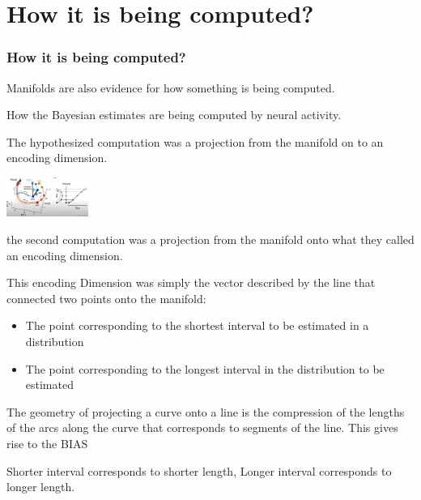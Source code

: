 \documentclass{beamer}
\begin{document}

\section{How it is being computed?}
\begin{frame}
\frametitle{\textbf{How it is being computed?} }


Manifolds are also evidence for how something is being computed.

How the Bayesian estimates are being computed by neural activity.

The hypothesized computation was a projection from the manifold on to an encoding dimension.


\centering
\begin{minipage}{1\textwidth}
    \centering
    \includegraphics[width=0.2\textwidth]{images/Sohn_et_al-2019_05.PNG} %
\end{minipage}

the second computation was a projection from the manifold onto what they called an encoding dimension.

This encoding Dimension was simply the vector described by the line that connected two points onto the manifold:

\begin{itemize}
    \item The point corresponding to the shortest interval to be estimated in a distribution
    \item The point corresponding to the longest interval in the distribution to be estimated
\end{itemize}

The geometry of projecting a curve onto a line is the compression of the lengths of the arcs along the curve that corresponds to segments of the line. This gives rise to the BIAS

Shorter interval corresponds to shorter length, Longer interval corresponds to longer length.


\end{frame}
\end{document}
